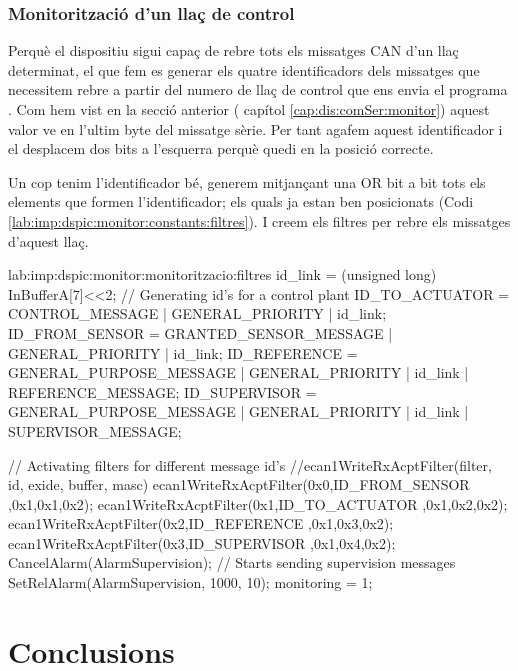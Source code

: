 \subsubsection{Monitorització d'un llaç de control}\label{lab:imp:dspic:monitor:monitoritzacio}

Perquè el dispositiu \Monitor sigui capaç de rebre tots els missatges CAN d'un llaç determinat, el que fem es generar els quatre identificadors dels missatges que necessitem rebre a partir del numero de llaç de control que ens envia el programa \DCSMonitor. Com hem vist en la secció anterior ( capítol \ref{cap:dis:comSer:monitor}) aquest valor ve en l'ultim byte del missatge sèrie. Per tant agafem aquest identificador i el desplacem dos bits a l'esquerra perquè quedi en la posició correcte.

Un cop tenim l'identificador bé, generem mitjançant una OR bit a bit tots els elements que formen l'identificador; els quals ja estan ben posicionats (Codi \ref{lab:imp:dspic:monitor:constants:filtres}). I creem els filtres per rebre els missatges d'aquest llaç.

\begin{code_c}{}{lab:imp:dspic:monitor:monitoritzacio:filtres}
id_link = (unsigned long) InBufferA[7]<<2;
// Generating id's for a control plant
ID_TO_ACTUATOR 		= CONTROL_MESSAGE 			| GENERAL_PRIORITY | id_link;
ID_FROM_SENSOR		= GRANTED_SENSOR_MESSAGE 	| GENERAL_PRIORITY | id_link;
ID_REFERENCE		= GENERAL_PURPOSE_MESSAGE 	| GENERAL_PRIORITY | id_link | REFERENCE_MESSAGE;
ID_SUPERVISOR		= GENERAL_PURPOSE_MESSAGE 	| GENERAL_PRIORITY | id_link | SUPERVISOR_MESSAGE;

// Activating filters for different message id's
//ecan1WriteRxAcptFilter(filter, id, exide, buffer, masc)
ecan1WriteRxAcptFilter(0x0,ID_FROM_SENSOR	,0x1,0x1,0x2);
ecan1WriteRxAcptFilter(0x1,ID_TO_ACTUATOR	,0x1,0x2,0x2);
ecan1WriteRxAcptFilter(0x2,ID_REFERENCE		,0x1,0x3,0x2);
ecan1WriteRxAcptFilter(0x3,ID_SUPERVISOR	,0x1,0x4,0x2);
CancelAlarm(AlarmSupervision);
// Starts sending supervision messages
SetRelAlarm(AlarmSupervision, 1000, 10);
monitoring = 1;
\end{code_c}


\section{Conclusions}\label{cap:imp:conc}

